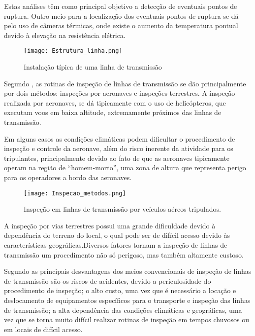  Estas análises têm como principal objetivo a detecção de eventuais pontos de ruptura. Outro meio para a localização dos eventuais pontos de ruptura se dá pelo uso de câmeras térmicas, onde existe o aumento da temperatura pontual devido à elevação na resistência elétrica. 
 
 \begin{figure}[h!]												
 	\centering												
 	\texttt{[image: Estrutura\_linha.png]}			
 	\caption{Instalação típica de uma linha de transmissão}		
 	\label{img:Estrutura_Linha}	
 \end{figure}
 
 Segundo \cite{rangel2009sistema}, as rotinas de inspeção de linhas de transmissão se dão principalmente por dois métodos: inspeções por aeronaves e inspeções terrestres.
 A inspeção realizada por aeronaves, se dá tipicamente com o uso de helicópteros, que executam voos em baixa altitude, extremamente próximos das linhas de transmissão. 
 
 Em alguns casos as condições climáticas podem dificultar o procedimento de inspeção e controle da aeronave, além do risco inerente da atividade para os tripulantes, principalmente devido ao fato de que as aeronaves tipicamente operam na região de “homem-morto”, uma zona de altura que representa perigo para os operadores a bordo das aeronaves.
 
  \begin{figure}[h!]												
  	\centering												
  	\texttt{[image: Inspecao\_metodos.png]}			
  	\caption{Inspeção em linhas de transmissão por veículos aéreos tripulados.}		
  	\label{img:Inspecao_metodos}	
  \end{figure}
 
 A inspeção por vias terrestres possui uma grande dificuldade devido à dependência do terreno do local, o qual pode ser de difícil acesso devido às características geográficas.Diversos fatores tornam a inspeção de linhas de transmissão um procedimento não só perigoso, mas também altamente custoso. 
 
 Segundo \cite{cinematicajuliana} as principais desvantagens dos meios convencionais de inspeção de linhas de transmissão são os riscos de acidentes, devido a periculosidade do procedimento de inspeção; o alto custo, uma vez que é necessário a locação e deslocamento de equipamentos específicos para o transporte e inspeção das linhas de transmissão; a alta dependência das condições climáticas e geográficas, uma vez que se torna muito difícil realizar rotinas de inspeção em tempos chuvosos ou em locais de difícil acesso.
 
